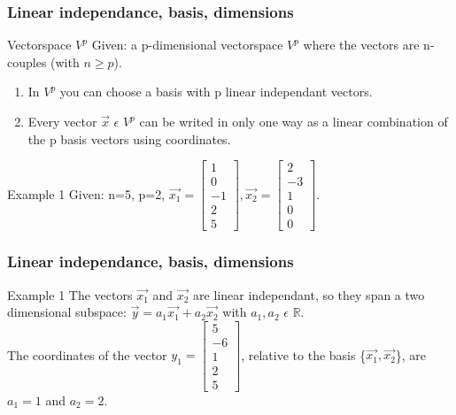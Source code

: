 \begin{frame}
	\frametitle{Linear independance, basis, dimensions}
	\begin{block}{Vectorspace $V^p$}
		Given: a p-dimensional vectorspace $V^p$ where the vectors are n-couples (with $n\geq p$).
		\begin{enumerate}
			\item In $V^p$ you can choose a basis with p linear independant vectors.
			\item Every vector $\overrightarrow{x}$ $\epsilon$ $V^p$ can be writed in only one way as a linear combination of the p basis vectors using coordinates.
		\end{enumerate}	
	\end{block}
	\begin{block}{Example 1}
		Given: n=5, p=2, $\overrightarrow{x_1}=\begin{bmatrix} 1\\0\\-1\\2\\5\end{bmatrix}, \overrightarrow{x_2}=\begin{bmatrix} 2\\-3\\1\\0\\0\end{bmatrix}$.\\
	\end{block}
\end{frame}

\begin{frame}
	\frametitle{Linear independance, basis, dimensions}
	\begin{block}{Example 1}
		The vectors $\overrightarrow{x_1}$ and $\overrightarrow{x_2}$ are linear independant, so they span a two dimensional subspace: $\overrightarrow{y}=a_1\overrightarrow{x_1}+a_2\overrightarrow{x_2}$ with $a_1, a_2$ $\epsilon$ $\mathbb{R}$.\\
		The coordinates of the vector $y_1=\begin{bmatrix} 5\\-6\\1\\2\\5\end{bmatrix}$, relative to the basis \big\{$\overrightarrow{x_1},\overrightarrow{x_2}$\big\}, are $a_1=1$ and $a_2=2$.
	\end{block}
\end{frame}

